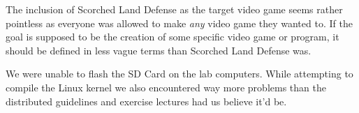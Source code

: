 The inclusion of Scorched Land Defense as the target video game seems rather pointless as everyone was allowed to make \textit{any} video game they wanted to.
If the goal is supposed to be the creation of some specific video game or program, it should be defined in less vague terms than Scorched Land Defense was.


We were unable to flash the SD Card on the lab computers.
While attempting to compile the Linux kernel we also encountered way more problems than the distributed guidelines and exercise lectures had us believe it'd be.
